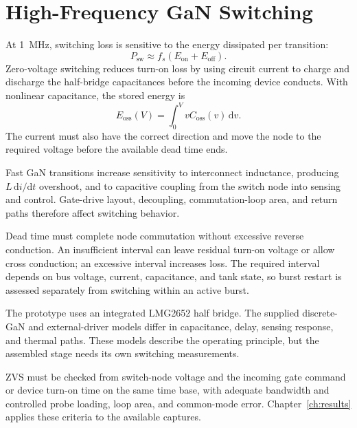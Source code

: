 \section{High-Frequency GaN Switching}
\label{sec:bg-gan}

At \SI{1}{\mega\hertz}, switching loss is sensitive to the energy dissipated per transition:
\begin{equation}
P_{\mathrm{sw}}\approx f_s(E_{\mathrm{on}}+E_{\mathrm{off}}).
\end{equation}
Zero-voltage switching reduces turn-on loss by using circuit current to charge and discharge the half-bridge capacitances before the incoming device conducts. With nonlinear capacitance, the stored energy is
\begin{equation}
E_{\mathrm{oss}}(V)=\int_0^V vC_{\mathrm{oss}}(v)\,\mathrm{d}v.
\end{equation}
The current must also have the correct direction and move the node to the required voltage before the available dead time ends.

Fast GaN transitions increase sensitivity to interconnect inductance, producing \(L\,\mathrm{d}i/\mathrm{d}t\) overshoot, and to capacitive coupling from the switch node into sensing and control. Gate-drive layout, decoupling, commutation-loop area, and return paths therefore affect switching behavior.

Dead time must complete node commutation without excessive reverse conduction. An insufficient interval can leave residual turn-on voltage or allow cross conduction; an excessive interval increases loss. The required interval depends on bus voltage, current, capacitance, and tank state, so burst restart is assessed separately from switching within an active burst.

The prototype uses an integrated LMG2652 half bridge. The supplied discrete-GaN and external-driver models differ in capacitance, delay, sensing response, and thermal paths. These models describe the operating principle, but the assembled stage needs its own switching measurements.

ZVS must be checked from switch-node voltage and the incoming gate command or device turn-on time on the same time base, with adequate bandwidth and controlled probe loading, loop area, and common-mode error. Chapter~\ref{ch:results} applies these criteria to the available captures.
